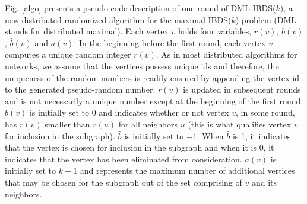 \documentclass[journal,12pt,onecolumn]{IEEEtran}
\begin{document}
Fig.\,\,\ref{algo} presents a pseudo-code description of one round of
DML-IBDS($k$), a new distributed randomized algorithm for the
maximal IBDS($k$) problem (DML stands for distributed maximal). Each vertex $v$ holds four variables,
$r(v)$, $b(v)$, $\hat{b}(v)$ and $a(v)$. In the beginning before the
first round, each vertex $v$ computes a unique random 
integer $r(v)$. As in most distributed algorithms for networks, we
assume that the vertices possess unique ids and therefore, the
uniqueness of the random numbers is readily ensured by appending the
vertex id to the generated pseudo-random number. $r(v)$ is updated in
subsequent rounds and is not necessarily a unique number except at the
beginning of the first round. $b(v)$ is initially set to 0 and  
indicates whether or not vertex $v$, in some round, has $r(v)$ smaller
than $r(u)$ for all neighbors $u$ (this is what qualifies vertex $v$
for inclusion in the subgraph). $\hat{b}$ is initially set to
$-1$. When $\hat{b}$ is 1, it indicates that the vertex is chosen for
inclusion in the subgraph and when it is 0, it indicates that the
vertex has been eliminated from consideration. $a(v)$ is initially set
to $k+1$ and represents the maximum number of additional vertices that may be chosen for the
subgraph out of the set comprising of $v$ and its neighbors.
\end{document}
